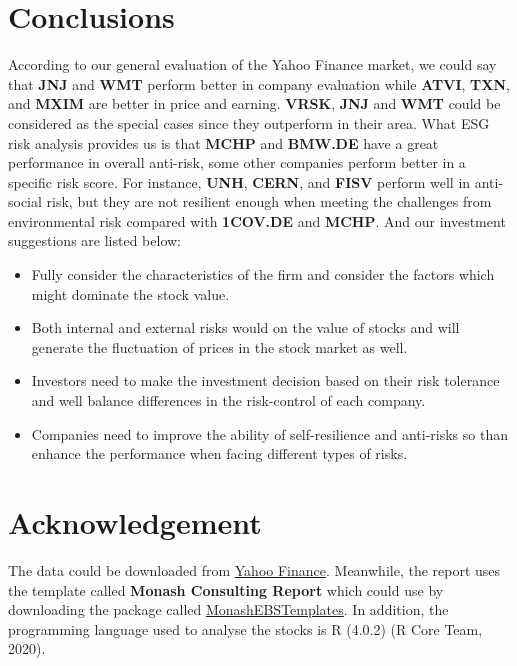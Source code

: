 \documentclass[11pt,a4paper,]{article}
\providecommand{\tightlist}{%
  \setlength{\itemsep}{0pt}\setlength{\parskip}{0pt}}
\begin{document}
\hypertarget{conclusions}{%
\section{Conclusions}\label{conclusions}}

According to our general evaluation of the Yahoo Finance market, we could say that \textbf{JNJ} and \textbf{WMT} perform better in company evaluation while \textbf{ATVI}, \textbf{TXN}, and \textbf{MXIM} are better in price and earning. \textbf{VRSK}, \textbf{JNJ} and \textbf{WMT} could be considered as the special cases since they outperform in their area. What ESG risk analysis provides us is that \textbf{MCHP} and \textbf{BMW.DE} have a great performance in overall anti-risk, some other companies perform better in a specific risk score. For instance, \textbf{UNH}, \textbf{CERN}, and \textbf{FISV} perform well in anti-social risk, but they are not resilient enough when meeting the challenges from environmental risk compared with \textbf{1COV.DE} and \textbf{MCHP}. And our investment suggestions are listed below:

\begin{itemize}
\tightlist
\item
  Fully consider the characteristics of the firm and consider the factors which might dominate the stock value.
\item
  Both internal and external risks would on the value of stocks and will generate the fluctuation of prices in the stock market as well.
\item
  Investors need to make the investment decision based on their risk tolerance and well balance differences in the risk-control of each company.
\item
  Companies need to improve the ability of self-resilience and anti-risks so than enhance the performance when facing different types of risks.
\end{itemize}

\clearpage

\hypertarget{acknowledgement}{%
\section{Acknowledgement}\label{acknowledgement}}

The data could be downloaded from \href{https://au.finance.yahoo.com/}{Yahoo Finance}. Meanwhile, the report uses the template called \textbf{Monash Consulting Report} which could use by downloading the package called \href{https://github.com/robjhyndman/MonashEBSTemplates}{MonashEBSTemplates}. In addition, the programming language used to analyse the stocks is R (4.0.2) (R Core Team, 2020).
\end{document}
